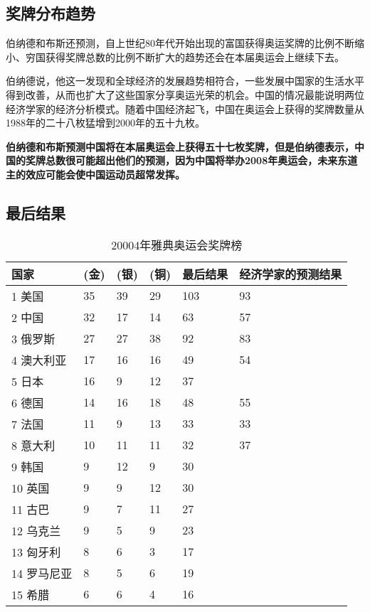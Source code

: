 \subsection{奖牌分布趋势}
伯纳德和布斯还预测，自上世纪80年代开始出现的富国获得奥运奖牌的比例不断缩小、穷国获得奖牌总数的比例不断扩大的趋势还会在本届奥运会上继续下去。 
	
伯纳德说，他这一发现和全球经济的发展趋势相符合，一些发展中国家的生活水平得到改善，从而也扩大了这些国家分享奥运光荣的机会。中国的情况最能说明两位经济学家的经济分析模式。随着中国经济起飞，中国在奥运会上获得的奖牌数量从1988年的二十八枚猛增到2000年的五十九枚。
	
\textbf{伯纳德和布斯预测中国将在本届奥运会上获得五十七枚奖牌，但是伯纳德表示，中国的奖牌总数很可能超出他们的预测，因为中国将举办2008年奥运会，未来东道主的效应可能会使中国运动员超常发挥。}
	
\subsection{最后结果}
\begin{longtable}{@{\extracolsep{1em}}llllll}
	\caption{20004年雅典奥运会奖牌榜}\\
	\hline
	国家      & (金) & (银) & (铜) & 最后结果 & 经济学家的预测结果 \\
	\hline
	1 美国    & 35  & 39  & 29  & 103  & 93        \\
	2 中国    & 32  & 17  & 14  & 63   & 57        \\
	3 俄罗斯   & 27  & 27  & 38  & 92   & 83        \\
	4 澳大利亚  & 17  & 16  & 16  & 49   & 54        \\
	5 日本    & 16  & 9   & 12  & 37   &           \\
	6 德国    & 14  & 16  & 18  & 48   & 55        \\
	7 法国    & 11  & 9   & 13  & 33   & 33        \\
	8 意大利   & 10  & 11  & 11  & 32   & 37        \\
	9 韩国    & 9   & 12  & 9   & 30   &           \\
	10 英国   & 9   & 9   & 12  & 30   &           \\
	11 古巴   & 9   & 7   & 11  & 27   &           \\
	12 乌克兰  & 9   & 5   & 9   & 23   &           \\
	13 匈牙利  & 8   & 6   & 3   & 17   &           \\
	14 罗马尼亚 & 8   & 5   & 6   & 19   &           \\
	15 希腊   & 6   & 6   & 4   & 16   &            \\
	\hline
\end{longtable}

